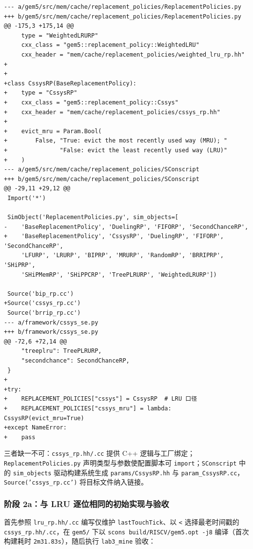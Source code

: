 \documentclass[12pt,a4paper,fontset=mac]{ctexart}
\begin{document}
\begin{lstlisting}[language={},caption={SimObject 三处注册的 Unified Diff（src/registration.diff）}]
--- a/gem5/src/mem/cache/replacement_policies/ReplacementPolicies.py
+++ b/gem5/src/mem/cache/replacement_policies/ReplacementPolicies.py
@@ -175,3 +175,14 @@
     type = "WeightedLRURP"
     cxx_class = "gem5::replacement_policy::WeightedLRU"
     cxx_header = "mem/cache/replacement_policies/weighted_lru_rp.hh"
+
+
+class CssysRP(BaseReplacementPolicy):
+    type = "CssysRP"
+    cxx_class = "gem5::replacement_policy::Cssys"
+    cxx_header = "mem/cache/replacement_policies/cssys_rp.hh"
+
+    evict_mru = Param.Bool(
+        False, "True: evict the most recently used way (MRU); "
+               "False: evict the least recently used way (LRU)"
+    )
--- a/gem5/src/mem/cache/replacement_policies/SConscript
+++ b/gem5/src/mem/cache/replacement_policies/SConscript
@@ -29,11 +29,12 @@
 Import('*')
 
 SimObject('ReplacementPolicies.py', sim_objects=[
-    'BaseReplacementPolicy', 'DuelingRP', 'FIFORP', 'SecondChanceRP',
+    'BaseReplacementPolicy', 'CssysRP', 'DuelingRP', 'FIFORP', 'SecondChanceRP',
     'LFURP', 'LRURP', 'BIPRP', 'MRURP', 'RandomRP', 'BRRIPRP', 'SHiPRP',
     'SHiPMemRP', 'SHiPPCRP', 'TreePLRURP', 'WeightedLRURP'])
 
 Source('bip_rp.cc')
+Source('cssys_rp.cc')
 Source('brrip_rp.cc')
--- a/framework/cssys_se.py
+++ b/framework/cssys_se.py
@@ -72,6 +72,14 @@
     "treeplru": TreePLRURP,
     "secondchance": SecondChanceRP,
 }
+
+try:
+    REPLACEMENT_POLICIES["cssys"] = CssysRP  # LRU 口径
+    REPLACEMENT_POLICIES["cssys_mru"] = lambda: CssysRP(evict_mru=True)
+except NameError:
+    pass
\end{lstlisting}

三者缺一不可：\texttt{cssys\_rp.hh/.cc} 提供 C++ 逻辑与工厂绑定；\texttt{ReplacementPolicies.py} 声明类型与参数使配置脚本可 \texttt{import}；\texttt{SConscript} 中的 \texttt{sim\_objects} 驱动构建系统生成 \texttt{params/CssysRP.hh} 与 \texttt{param\_CssysRP.cc}，\texttt{Source('cssys\_rp.cc')} 将目标文件纳入链接。

\subsubsection{阶段 2a：与 LRU 逐位相同的初始实现与验收}
首先参照 \texttt{lru\_rp.hh/.cc} 编写仅维护 \texttt{lastTouchTick}、以 \texttt{<} 选择最老时间戳的 \texttt{cssys\_rp.hh/.cc}，在 \texttt{gem5/} 下以 \texttt{scons build/RISCV/gem5.opt -j8} 编译（首次构建耗时 \texttt{2m31.83s}），随后执行 \texttt{lab3\_mine} 验收：
\end{document}
